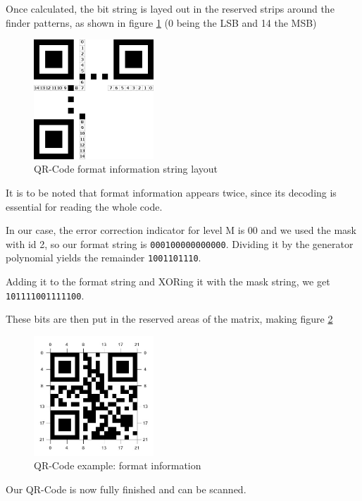 Once calculated, the bit string is layed out in the reserved strips around the finder patterns, as shown in figure \ref{fig:qr_fmt_layout} (0 being the LSB and 14 the MSB)

\begin{figure}[H]
  \centering
  \includegraphics[width=0.4\textwidth]{images/qr_fmt_layout}
  \caption{QR-Code format information string layout}
  \label{fig:qr_fmt_layout}
\end{figure}

It is to be noted that format information appears twice, since its decoding is essential for reading the whole code.

In our case, the error correction indicator for level M is 00 and we used the mask with id 2, so our format string is \texttt{000100000000000}. Dividing it by the generator polynomial yields the remainder \texttt{1001101110}.

Adding it to the format string and XORing it with the mask string, we get \texttt{101111001111100}.

These bits are then put in the reserved areas of the matrix, making figure \ref{fig:qr_fmt_info}

\begin{figure}[H]
  \centering
  \includegraphics[width=0.4\textwidth]{images/qr_fmt_info}
  \caption{QR-Code example: format information}
  \label{fig:qr_fmt_info}
\end{figure}

Our QR-Code is now fully finished and can be scanned.


